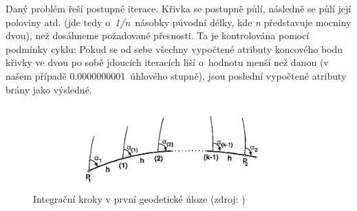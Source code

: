 Daný problém řeší postupné iterace. Křivka se postupně půlí, následně se půlí její poloviny atd. (jde
tedy o~\textit{1/n}~násobky původní délky, kde \textit{n} představuje mocniny dvou), než dosáhneme
požadované přesnosti. Ta je kontrolována pomocí podmínky cyklu: Pokud se od sebe všechny vypočtené
atributy koncového bodu křivky ve dvou po sobě jdoucích iteracích liší o~hodnotu menší než danou
(v našem případě 0.0000000001~úhlového stupně), jsou poslední vypočtené atributy brány jako výsledné. 


  \begin{figure}[H]
   \centering
	\includegraphics[scale=0.4]{./pictures/prvnigu-integrace.png}
	\caption[Integrační kroky v první geodetické úloze]{Integrační kroky v první geodetické úloze
	(zdroj: \cite{vyssigeodezie})}
      \label{fig:prvnigu-integrace}
  \end{figure}






